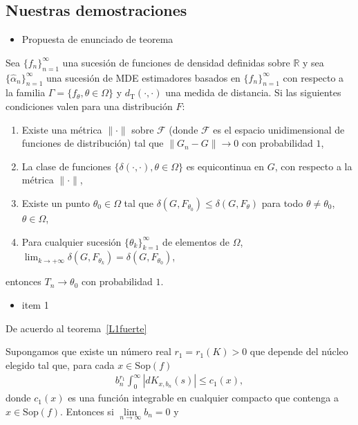 \subsection{Nuestras demostraciones}

\begin{itemize}
	\item Propuesta de enunciado de teorema
\end{itemize}

\begin{theorem}
	Sea $\{f_n\}_{n=1}^{\infty}$ una sucesión de funciones de densidad definidas sobre $\mathbb{R}$ y sea $\{\widehat{\alpha}_n\}_{n=1}^{\infty}$ una sucesión de MDE estimadores basados en $\{f_n\}_{n=1}^{\infty}$ con respecto a la familia $\Gamma=\{f_{\theta},\theta \in \Omega\}$ y $d_{\text{T}}(\cdot,\cdot)$ una medida de distancia. Si las siguientes condiciones valen para una distribución $F$:
	\begin{enumerate}
		\item Existe una métrica $\parallel \cdot \parallel$ sobre $\mathcal{F}$ (donde $\mathcal{F}$ es el espacio unidimensional de funciones de distribución) tal que $\parallel G_n - G \parallel \longrightarrow 0$ con probabilidad $1$,
		\item La clase de funciones $\{\delta(\cdot,\cdot), \theta \in \Omega\}$ es equicontinua en $G$, con respecto a la métrica $\parallel \cdot \parallel$,
		\item Existe un punto $\theta_0 \in \Omega$ tal que $\delta(G,F_{\theta_0}) \leq \delta(G,F_{\theta})$ para todo $\theta \neq \theta_0$, $\theta \in \Omega$,
		\item Para cualquier sucesión $\{\theta_k\}_{k=1}^{\infty}$ de elementos de $\Omega$, $\lim_{k \to+\infty} \delta(G,F_{\theta_k})=\delta(G,F_{\theta_0})$,
	\end{enumerate}
	entonces $T_n \longrightarrow \theta_0$ con probabilidad $1$.
\end{theorem}

\begin{itemize}
	\item item 1
\end{itemize}

De acuerdo al teorema~\ref{L1fuerte} 

Supongamos que existe un número real $r_1=r_1(K)>0$ que depende del núcleo elegido tal que, para cada $x \in \mathrm{Sop}(f)$ 
\begin{align}
b_n^{r_1} \displaystyle{\int_0^{\infty}} | dK_{x,b_n}(s) | \leq c_1(x),
\end{align}
donde $c_1(x)$ es una función integrable en cualquier compacto que contenga a $x \in \mathrm{Sop}(f)$. Entonces si $\lim\limits_{n \rightarrow \infty} b_n=0 $ y

